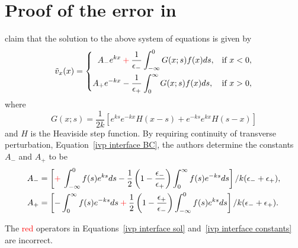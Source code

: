 \chapter{Proof of the error in \cite{rae_etal81}}

\cite{rae_etal81} claim that the solution to the above system of equations is given by 
\begin{equation}
\tilde{v}_x(x) = \left\{
\begin{aligned}
A_-e^{kx}  \: \textcolor{red}{+} \: \frac{1}{\epsilon_-} & \int_{-\infty}^{0} G(x;s)f(x)ds, & \text{if  } x<0,\\
A_+e^{-kx} - \frac{1}{\epsilon_+} & \int_{0}^{\infty} G(x;s)f(x)ds, & \text{if  } x>0,
\end{aligned}
\right.
\label{ivp interface sol}
\end{equation}
where
\begin{equation}
G(x;s) = \frac{1}{2k}[e^{ks}e^{-kx}H(x-s) + e^{-ks}e^{kx}H(s-x)]
\end{equation}
and $H$ is the Heaviside step function. By requiring continuity of transverse perturbation, Equation~\eqref{ivp interface BC}, the authors determine the constants $A_-$ and $A_+$ to be
\begin{align}
A_- & = \left[\textcolor{red}{+} \: \int_{-\infty}^0 f(s)e^{ks} ds - \frac{1}{2}\left(1 - \frac{\epsilon_-}{\epsilon_+}\right)\int_0^\infty f(s)e^{-ks} ds\right] / k(\epsilon_- + \epsilon_+), \\
A_+ & = \left[-\int_0^\infty f(s)e^{-ks} ds \: \textcolor{red}{+} \: \frac{1}{2}\left(1 - \frac{\epsilon_+}{\epsilon_-}\right)\int_{-\infty}^0 f(s)e^{ks} ds\right] / k(\epsilon_- + \epsilon_+).
\label{ivp interface constants}
\end{align}

The \textcolor{red}{red} operators in Equations~\eqref{ivp interface sol} and~\eqref{ivp interface constants} are incorrect.

